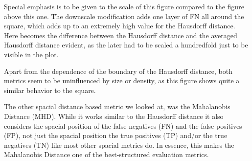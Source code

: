 \documentclass[journal]{IEEEtran}
\begin{document}
Special emphasis is to be given to the scale of this figure compared to the figure above this one. The downscale modification adds one layer of FN all around the square, which adds up to an extremely high value for the Hausdorff distance. Here becomes the difference between the Hausdorff distance and the averaged Hausdorff distance evident, as the later had to be scaled a hundredfold just to be visible in the plot.


Apart from the dependence of the boundary of the Hausdorff distance, both metrics seem to be uninfluenced by size or density, as this figure shows quite a similar behavior to the square.

\hspace{2in}

The other spacial distance based metric we looked at, was the Mahalanobis Distance (MHD). While it works similar to the Hausdorff distance it also considers the spacial position of the false negatives (FN) and the false positives (FP), not just the spacial position the true positives (TP) and/or the true negatives (TN) like most other spacial metrics do. In essence, this makes the Mahalanobis Distance one of the best-structured evaluation metrics. 

\end{document}
